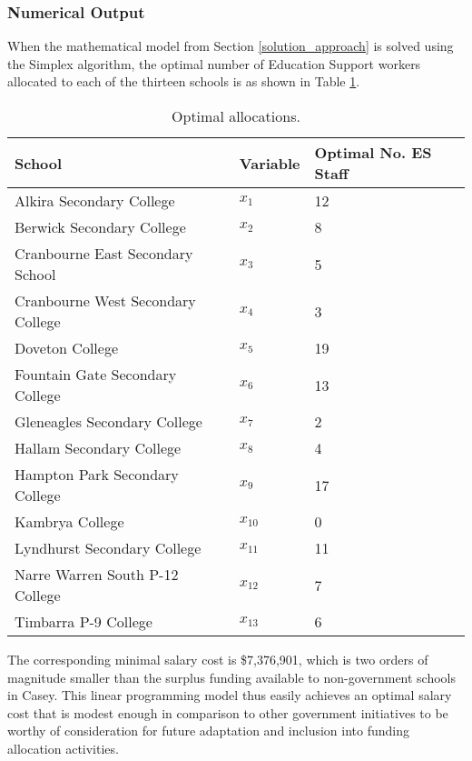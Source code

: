 \documentclass[11pt, a4paper]{article}
\begin{document}
    \subsubsection{Numerical Output}

    When the mathematical model from Section \ref{solution_approach} is solved using the Simplex algorithm, the optimal number of Education Support workers allocated to each of the thirteen schools is as shown in Table \ref{results3}.

    \begin{table}[!ht]
        \centering
        \caption{Optimal allocations.}
        \begin{tabular}{|l|l|l|}
            \hline
            School & Variable & Optimal No. ES Staff        \\ \hline
            Alkira Secondary College & $x_1$ & 12             \\ \hline
            Berwick Secondary College & $x_2$ & 8          \\ \hline
            Cranbourne East Secondary School & $x_3$ & 5            \\ \hline
            Cranbourne West Secondary College & $x_4$ & 3          \\ \hline
            Doveton College & $x_5$ & 19                        \\ \hline
            Fountain Gate Secondary College & $x_6$ & 13             \\ \hline
            Gleneagles Secondary College & $x_7$ & 2           \\ \hline
            Hallam Secondary College & $x_8$ & 4               \\ \hline
            Hampton Park Secondary College & $x_9$ & 17             \\ \hline
            Kambrya College & $x_{10}$ & 0                     \\ \hline
            Lyndhurst Secondary College & $x_{11}$ & 11                 \\ \hline
            Narre Warren South P-12 College & $x_{12}$ & 7                 \\ \hline
            Timbarra P-9 College & $x_{13}$ & 6                    \\ \hline
        \end{tabular}
        \label{results3}
    \end{table}

    The corresponding minimal salary cost is \$7,376,901, which is two orders of magnitude smaller than the surplus funding available to non-government schools in Casey. This linear programming model thus easily achieves an optimal salary cost that is modest enough in comparison to other government initiatives to be worthy of consideration for future adaptation and inclusion into funding allocation activities.
\end{document}
